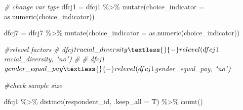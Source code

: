 \documentclass[
]{article}
\newenvironment{Shaded}{\begin{snugshade}}{\end{snugshade}}
\newcommand{\AttributeTok}[1]{\textcolor[rgb]{0.77,0.63,0.00}{#1}}
\newcommand{\CommentTok}[1]{\textcolor[rgb]{0.56,0.35,0.01}{\textit{#1}}}
\newcommand{\FunctionTok}[1]{\textcolor[rgb]{0.00,0.00,0.00}{#1}}
\newcommand{\NormalTok}[1]{#1}
\newcommand{\OtherTok}[1]{\textcolor[rgb]{0.56,0.35,0.01}{#1}}
\newcommand{\SpecialCharTok}[1]{\textcolor[rgb]{0.00,0.00,0.00}{#1}}
\newcommand{\StringTok}[1]{\textcolor[rgb]{0.31,0.60,0.02}{#1}}
\begin{document}
\begin{Shaded}
\end{Shaded}

\begin{Shaded}
\begin{Highlighting}[]
\CommentTok{\# change var type      }
\NormalTok{dfcj1 }\OtherTok{=}\NormalTok{ dfcj1 }\SpecialCharTok{\%\textgreater{}\%} 
  \FunctionTok{mutate}\NormalTok{(}\AttributeTok{choice\_indicator =} \FunctionTok{as.numeric}\NormalTok{(choice\_indicator)) }

\NormalTok{dfcj7 }\OtherTok{=}\NormalTok{ dfcj7 }\SpecialCharTok{\%\textgreater{}\%} 
  \FunctionTok{mutate}\NormalTok{(}\AttributeTok{choice\_indicator =} \FunctionTok{as.numeric}\NormalTok{(choice\_indicator)) }

\CommentTok{\#relevel factors}
\CommentTok{\# dfcj1$racial\_diversity \textless{}{-} relevel(dfcj1$racial\_diversity, "no")}
\CommentTok{\# }
\CommentTok{\# dfcj1$gender\_equal\_pay \textless{}{-} relevel(dfcj1$gender\_equal\_pay, "no")}
\end{Highlighting}
\end{Shaded}

\begin{Shaded}
\begin{Highlighting}[]
\CommentTok{\#check sample size}

\NormalTok{dfcj1 }\SpecialCharTok{\%\textgreater{}\%} 
  \FunctionTok{distinct}\NormalTok{(respondent\_id, }\AttributeTok{.keep\_all =}\NormalTok{ T) }\SpecialCharTok{\%\textgreater{}\%} 
  \FunctionTok{count}\NormalTok{()}
\end{Highlighting}
\end{Shaded}
\end{document}
